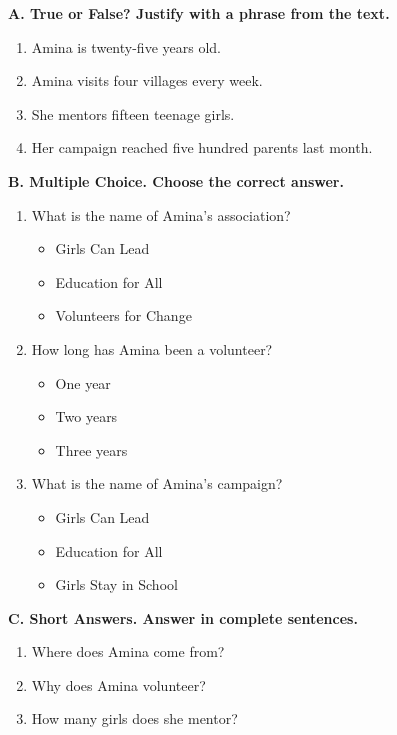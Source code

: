 \documentclass[11pt]{article}
\begin{document}
\begin{exercice}
\textbf{A. True or False? Justify with a phrase from the text.}
\begin{enumerate}
\item Amina is twenty-five years old.
\item Amina visits four villages every week.
\item She mentors fifteen teenage girls.
\item Her campaign reached five hundred parents last month.
\end{enumerate}

\textbf{B. Multiple Choice. Choose the correct answer.}
\begin{enumerate}
\item What is the name of Amina's association?
      \begin{itemize}
      \item[a)] Girls Can Lead
      \item[b)] Education for All
      \item[c)] Volunteers for Change
      \end{itemize}
\item How long has Amina been a volunteer?
      \begin{itemize}
      \item[a)] One year
      \item[b)] Two years
      \item[c)] Three years
      \end{itemize}
\item What is the name of Amina's campaign?
      \begin{itemize}
      \item[a)] Girls Can Lead
      \item[b)] Education for All
      \item[c)] Girls Stay in School
      \end{itemize}
\end{enumerate}

\textbf{C. Short Answers. Answer in complete sentences.}
\begin{enumerate}
\item Where does Amina come from?
\item Why does Amina volunteer?
\item How many girls does she mentor?
\end{enumerate}
\end{exercice}
\end{document}
